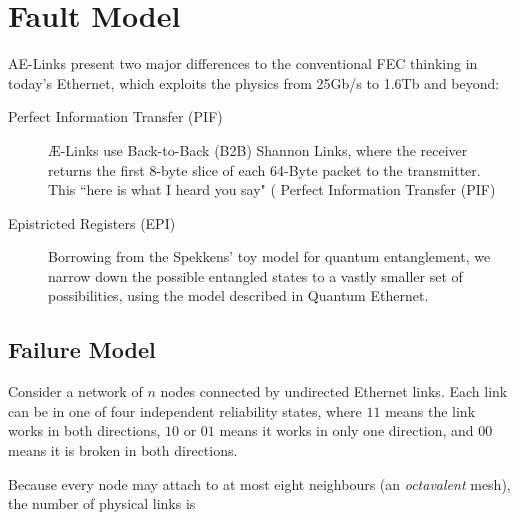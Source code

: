 \documentclass[../../../OAE-SPEC-MAIN.tex]{subfiles}
\begin{document}
\section{Fault Model}


AE-Links present two major differences to the conventional FEC thinking in today's Ethernet, which exploits the physics from 25Gb/s to 1.6Tb and beyond:

\begin{description}
\item [Perfect Information Transfer (PIF)] Æ-Links use Back-to-Back (B2B) Shannon Links, where the receiver returns the first 8-byte slice of each 64-Byte packet to the transmitter. This ``here is what I heard you say" ( Perfect Information Transfer (PIF)%

\item [Epistricted Registers (EPI)] Borrowing from the Spekkens' toy model for quantum entanglement, we narrow down the possible entangled states to a vastly smaller set of possibilities, using the model described in Quantum Ethernet\cite{Borrill2022}.
\end{description}



\subsection{Failure Model}

Consider a network of \(n\) nodes connected by undirected Ethernet
links.  Each link can be in one of four independent reliability
states,
\marginnote{
\[
\Sigma=\{00,01,10,11\},
\]}
where \(11\) means the link works in both directions, \(10\) or
\(01\) means it works in only one direction, and \(00\) means it
is broken in both directions.


Because every node may attach to at most eight neighbours (an
\emph{octavalent} mesh), the number of physical links is
\marginnote{
\[
L(n)=\min\!\bigl\{\tbinom{n}{2},\,4n\bigr\}
=
\begin{cases}
\binom{n}{2}, & n\le 9,\\[6pt]
4n,            & n\ge 9.
\end{cases}
\]}
\end{document}
